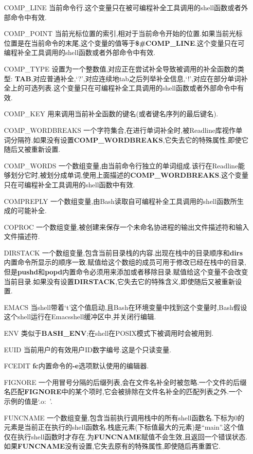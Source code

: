 \documentclass[draft,openany]{book}
\begin{document}
\begin{CJK}{UTF8}{gbsn}
\begin{basedescript}{\desclabelstyle{\nextlinelabel}\desclabelwidth{2.5em}}
    \item[COMP\_LINE] 当前命令行.这个变量只在被可编程补全工具调用的shell函数或者外部命令中有效.
    \item[COMP\_POINT] 当前光标位置的索引,相对于当前命令开始的位置.如果当前光标位置是在当前命令的末尾,这个变量的值等于\textbf{\$\#COMP\_LINE}.这个变量只在可编程补全工具调用的shell函数或者外部命令中有效.
    \item[COMP\_TYPE] 设置为一个整数值,对应正在尝试补全导致被调用的补全函数的类型: \textbf{TAB},对应普通补全,`?',对应连续地tab之后列举补全信息,`!',对应在部分单词补全上的可选列表.这个变量只在可编程补全工具调用的shell函数或者外部命令中有效.
    \item[COMP\_KEY] 用来调用当前补全函数的键名(或者键名序列的最后键名).
    \item[COMP\_WORDBREAKS] 一个字符集合,在进行单词补全时,被Readline库视作单词分隔符.如果没有设置\textbf{COMP\_WORDBREAKS},它失去它的特殊属性,即使它随后又被重新设置.
    \item[COMP\_WORDS] 一个数组变量,由当前命令行独立的单词组成.该行在Readline能够划分它时,被划分成单词,使用上面描述的\textbf{COMP\_WORDBREAKS}.这个变量只在可编程补全工具调用的shell函数中有效.
    \item[COMPREPLY] 一个数组变量,由Bash读取自可编程补全工具调用的shell函数所生成的可能补全.
    \item[COPROC] 一个数组变量,被创建来保存一个未命名协进程的输出文件描述符和输入文件描述符.
    \item[DIRSTACK] 一个数组变量,包含当前目录栈的内容.出现在栈中的目录顺序和\textbf{dirs}内置命令所显示的顺序一致.赋值给这个数组的成员可用于修改已经在栈中的目录,但是\textbf{pushd}和\textbf{popd}内置命令必须用来添加或者移除目录.赋值给这个变量不会改变当前目录.如果没有设置\textbf{DIRSTACK},它失去它的特殊含义,即使随后又被重新设置.
    \item[EMACS] 当shell带着`t'这个值启动,且Bash在环境变量中找到这个变量时,Bash假设这个shell运行在Emacsshell缓冲区中,并关闭行编辑.
    \item[ENV] 类似于\textbf{BASH\_ENV};在shell在POSIX模式下被调用时会被用到.
    \item[EUID] 当前用户的有效用户ID数字编号.这是个只读变量.
    \item[FCEDIT] \textbf{fc}内置命令的\textbf{-e}选项默认使用的编辑器.
    \item[FIGNORE] 一个用冒号分隔的后缀列表,会在文件名补全时被忽略.一个文件的后缀名匹配\textbf{FIGNORE}中的某个项时,它会被排除在文件名补全的匹配列表之外.一个示例的值是`.o:~'.
    \item[FUNCNAME] 一个数组变量,包含当前执行调用栈中的所有shell函数名.下标为0的元素是当前正在执行的shell函数名.栈底元素(下标值最大的元素)是``main''.这个值仅在执行shell函数时才存在.为\textbf{FUNCNAME}赋值不会生效,且返回一个错误状态.如果\textbf{FUNCNAME}没有设置,它失去原有的特殊属性,即使随后再重置它.

\end{basedescript}
\end{CJK}
\end{document}
